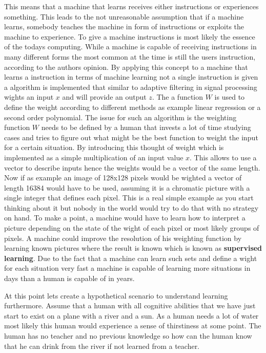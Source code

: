 \documentclass[conference]{IEEEtran}
\begin{document}
This means that a machine that learns receives either instructions or experiences something. This leads to the not unreasonable assumption that if a machine learns, somebody teaches the machine in form of instructions or exploits the machine to experience. To give  a machine instructions is most likely the essence of the todays computing. While a machine is capable of receiving instructions in many different forms the most common at the time is still the users instruction, according to the authors opinion. By applying this concept to a machine that learns a instruction in terms of machine learning not a single instruction is given a algorithm is implemented that similar to adaptive filtering in signal processing wights an input $x$ and will provide an output $z$. The a function $W$ is used to define the weight according to different methods as example linear regression or a second order polynomial. The issue for such an algorithm is the weighting function $W$ needs to be defined by a human that invests a lot of time studying cases and tries to figure out what might be the best function to weight the input for a certain situation. By introducing this thought of weight which is implemented as a simple multiplication of an input value $x$.  This allows to use a vector to describe inputs hence the weights would be a vector of the same length. Now if as example an image of 128x128 pixels would be wighted a vector of length 16384 would have to be used, assuming it is a chromatic picture with a single integer that defines each pixel. This is a real simple example as you start thinking about it but nobody in the world would try to do that with no strategy on hand. To make a point, a machine would have to learn how to interpret a picture depending on the state of the wight of each pixel or most likely groups of pixels. A machine could improve the resolution of his weighting function by learning known pictures where the result is known which is known as \textbf{supervised learning}. Due to the fact that a machine can learn such sets and define a wight for each situation very fast a machine is capable of learning more situations in days than a human is capable of in years.

At this point lets create a hypothetical scenario to understand learning furthermore. Assume that a human with all cognitive abilities that we have just start to exist on a plane with a river and a sun. As a human needs a lot of water most likely this human would experience a sense of thirstiness at some point. The human has no teacher and no previous knowledge so how can the human know that he can drink from the river if not learned from a teacher.
\end{document}

